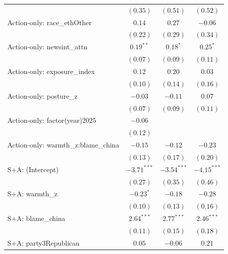 \begin{tabular}{l c c c}
                                       & $(0.35)$      & $(0.51)$      & $(0.52)$      \\
Action-only: race\_ethOther            & $0.14$        & $0.27$        & $-0.06$       \\
                                       & $(0.22)$      & $(0.29)$      & $(0.34)$      \\
Action-only: newsint\_attn             & $0.19^{**}$   & $0.18^{*}$    & $0.25^{*}$    \\
                                       & $(0.07)$      & $(0.09)$      & $(0.11)$      \\
Action-only: exposure\_index           & $0.12$        & $0.20$        & $0.03$        \\
                                       & $(0.10)$      & $(0.14)$      & $(0.16)$      \\
Action-only: posture\_z                & $-0.03$       & $-0.11$       & $0.07$        \\
                                       & $(0.07)$      & $(0.09)$      & $(0.11)$      \\
Action-only: factor(year)2025          & $-0.06$       &               &               \\
                                       & $(0.12)$      &               &               \\
Action-only: warmth\_z:blame\_china    & $-0.15$       & $-0.12$       & $-0.23$       \\
                                       & $(0.13)$      & $(0.17)$      & $(0.20)$      \\
S+A: (Intercept)                       & $-3.71^{***}$ & $-3.54^{***}$ & $-4.15^{***}$ \\
                                       & $(0.27)$      & $(0.35)$      & $(0.46)$      \\
S+A: warmth\_z                         & $-0.23^{*}$   & $-0.18$       & $-0.28$       \\
                                       & $(0.10)$      & $(0.13)$      & $(0.16)$      \\
S+A: blame\_china                      & $2.64^{***}$  & $2.77^{***}$  & $2.46^{***}$  \\
                                       & $(0.11)$      & $(0.15)$      & $(0.18)$      \\
S+A: party3Republican                  & $0.05$        & $-0.06$       & $0.21$        \\

\end{tabular}
